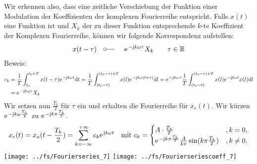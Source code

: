 \documentclass[11pt,a4paper,DIV=12]{scrartcl}
\newcommand{\diff}{\mathrm{d}}
\begin{document}
Wir erkennen also, dass eine zeitliche Verschiebung der Funktion einer Modulation der Koeffizienten der komplexen Fourierreihe entspricht. Falls $x(t)$ eine Funktion ist und $X_k$ der zu dieser Funktion entsprechende $k$-te Koeffizient der Komplexen Fourierreihe, können wir folgende Korrespondenz aufstellen:
\begin{align}
	x(t-\tau)\quad\fourier\quad\e^{-\im k \omega \tau}X_k\quad\quad\tau\in\mathbb{R}
\end{align}
Beweis:
\begin{align}
	c_k&=\frac{1}{T}\int_{t_0}^{t_0+T}x(t-\tau)\e^{-\im k \omega t}\diff t=\frac{1}{T}\int_{(t_0-\tau)}^{(t_0-\tau)+T}x(l)\e^{-\im k \omega (l+\tau)}\diff l = \e^{-\im k \omega \tau}\frac{1}{T}\int_{(t_0-\tau)}^{(t_0-\tau)+T}x(l)\e^{-\im k \omega l}x(l)\diff l\nonumber \\
	&=\e^{-\im k \omega \tau}X_k
\end{align}
Wir setzen nun $\frac{T_h}{2}$ für $\tau$ ein und erhalten die Fourierreihe für $x_{e}(t)$. Wir kürzen $\e^{-\im k \omega \frac{T_h}{2}}$ zu $\e^{-\im k \pi \frac{T_h}{T}}$.
\begin{align}
	x_{e}(t)=x_a(t-\frac{T_h}{2})=\sum_{k=-\infty}^{+\infty}c_k\e^{\im k \omega t}\quad\text{mit } c_k=\begin{cases}
		A\cdot\frac{T_h}{T}&,k=0, \\
		\e^{-\im k \pi \frac{T_h}{T}}\frac{A}{k\pi}\sin(k\pi\frac{T_h}{T})&,k\neq0.
	\end{cases}
\end{align}
\newpage
\texttt{[image: ../fs/Fourierseries\_7]}
\texttt{[image: ../fs/Fourierseriescoeff\_7]}
\newpage
\end{document}
